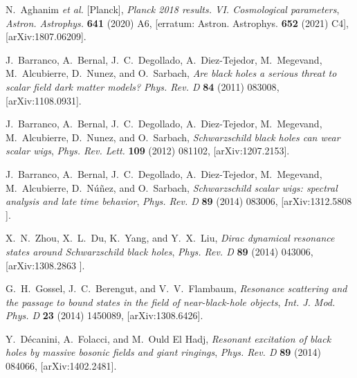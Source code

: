 \begin{thebibliography}{99}


N.~Aghanim \textit{et al.} [Planck],
\emph{Planck 2018 results. VI. Cosmological parameters},
{\emph{Astron. Astrophys.} {\bfseries 641} (2020) A6},
[erratum: Astron. Astrophys. \textbf{652} (2021) C4],
[{{\ttfamily arXiv:1807.06209}}].

J.~Barranco, A.~Bernal, J.~C.~Degollado, A.~Diez-Tejedor, M.~Megevand, M.~Alcubierre, D.~Nunez, and O.~Sarbach,
\emph{Are black holes a serious threat to scalar field dark matter models?}
{\emph{Phys. Rev. D} {\bfseries 84} (2011) 083008},
[{{\ttfamily arXiv:1108.0931}}].


J.~Barranco, A.~Bernal, J.~C.~Degollado, A.~Diez-Tejedor, M.~Megevand, M.~Alcubierre, D.~Nunez, and O.~Sarbach,
\emph{Schwarzschild black holes can wear scalar wigs},
{\emph{Phys. Rev. Lett.} {\bfseries 109} (2012) 081102},
[{{\ttfamily arXiv:1207.2153}}].

J.~Barranco, A.~Bernal, J.~C.~Degollado, A.~Diez-Tejedor, M.~Megevand, M.~Alcubierre, D.~N\'u\~nez, and O.~Sarbach,
\emph{Schwarzschild scalar wigs: spectral analysis and late time behavior},
{\emph{Phys. Rev. D} {\bfseries 89} (2014)  083006},
[{{\ttfamily arXiv:1312.5808 }}].


X.~N.~Zhou, X.~L.~Du, K.~Yang, and Y.~X.~Liu,
\emph{Dirac dynamical resonance states around Schwarzschild black holes},
{\emph{Phys. Rev. D} {\bfseries 89} (2014)  043006},
[{{\ttfamily arXiv:1308.2863 }}].


G.~H.~Gossel, J.~C.~Berengut, and V.~V.~Flambaum,
\emph{Resonance scattering and the passage to bound states in the field of near-black-hole objects},
{\emph{Int. J. Mod. Phys. D} {\bfseries 23} (2014) 1450089},
[{{\ttfamily arXiv:1308.6426}}].


Y.~D\'ecanini, A.~Folacci, and M.~Ould El Hadj,
\emph{Resonant excitation of black holes by massive bosonic fields and giant ringings},
{\emph{Phys. Rev. D} {\bfseries 89} (2014) 084066},
[{{\ttfamily arXiv:1402.2481}}].



\end{thebibliography}
